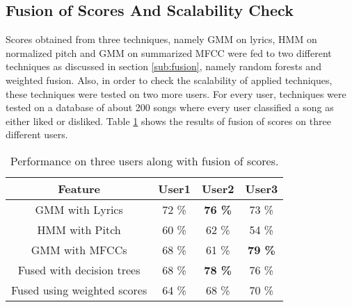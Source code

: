 \subsection{Fusion of Scores And Scalability Check} Scores obtained from three techniques, namely GMM on lyrics, HMM on normalized pitch and GMM on summarized MFCC were fed to two different techniques as discussed in section \ref{sub:fusion}, namely random forests and weighted fusion. Also, in order to check the scalability of applied techniques, these techniques were tested on two more users. For every user, techniques were tested on a database of about 200 songs where every user classified a song as either liked or disliked. Table \ref{tab:comb} shows the results of fusion of scores on three different users.
\begin{table}[!htbp]
\begin{center}
\begin{tabular}{ |c|c|c|c| } 
 \hline
  Feature & User1 & User2 & User3 \\ \hline
 GMM with Lyrics & 72 \% & \textbf{76 \%} & 73 \% \\ 
 HMM with Pitch & 60 \% & 62 \%  & 54 \% \\
 GMM with MFCCs & 68 \% & 61 \% & \textbf{79 \%} \\ \hline
 Fused with decision trees & 68 \% & \textbf{78 \%}   & 76 \% \\
 \hline
 Fused using weighted scores & 64 \% & 68 \%  & 70 \%\\
 \hline
\end{tabular}
\end{center}
\caption{Performance on three users along with fusion of scores.} \label{tab:comb}
\end{table}
